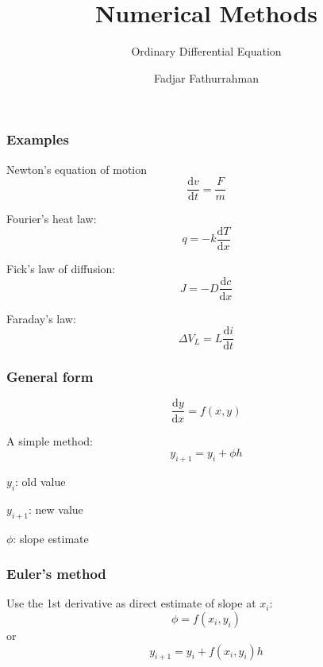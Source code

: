 



\title{Numerical Methods}
\subtitle{Ordinary Differential Equation}
\author{Fadjar Fathurrahman}
\date{}


\frame{\titlepage}


\begin{frame}
\frametitle{Examples}

Newton's equation of motion
\begin{equation*}
\frac{\mathrm{d}v}{\mathrm{d}t} = \frac{F}{m}
\end{equation*}

Fourier's heat law:
\begin{equation*}
q = -k \frac{\mathrm{d}T}{\mathrm{d}x}
\end{equation*}

Fick's law of diffusion:
\begin{equation*}
J = -D \frac{\mathrm{d}c}{\mathrm{d}x}
\end{equation*}

Faraday's law:
\begin{equation*}
\Delta V_{L} = L \frac{\mathrm{d}i}{\mathrm{d}t}
\end{equation*}

\end{frame}


\begin{frame}
\frametitle{General form}

\begin{equation}
\frac{\mathrm{d}y}{\mathrm{d}x} = f(x,y)
\label{eq:ode_gen01}
\end{equation}

A simple method:
\begin{equation*}
y_{i+1} = y_{i} + \phi h
\end{equation*}

$y_{i}$: old value

$y_{i+1}$: new value

$\phi$: slope estimate

\end{frame}


\begin{frame}
\frametitle{Euler's method}

Use the 1st derivative as direct estimate of slope at $x_i$:
\begin{equation*}
\phi = f(x_i, y_i)
\end{equation*}
or
\begin{equation*}
y_{i+1} = y_{i} + f(x_i, y_i) h
\end{equation*}

\end{frame}


